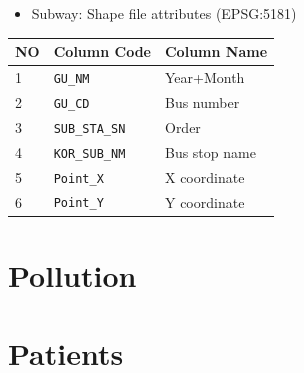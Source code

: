 \documentclass[]{book}
\providecommand{\tightlist}{%
  \setlength{\itemsep}{0pt}\setlength{\parskip}{0pt}}
\theoremstyle{definition}
\theoremstyle{definition}
\theoremstyle{definition}
\theoremstyle{remark}
\begin{document}
\begin{itemize}
\tightlist
\item
  Subway: Shape file attributes (EPSG:5181)
\end{itemize}

\begin{longtable}[]{@{}lll@{}}
\toprule
NO & Column Code & Column Name\tabularnewline
\midrule
\endhead
1 & \texttt{GU\_NM} & Year+Month\tabularnewline
2 & \texttt{GU\_CD} & Bus number\tabularnewline
3 & \texttt{SUB\_STA\_SN} & Order\tabularnewline
4 & \texttt{KOR\_SUB\_NM} & Bus stop name\tabularnewline
5 & \texttt{Point\_X} & X coordinate\tabularnewline
6 & \texttt{Point\_Y} & Y coordinate\tabularnewline
\bottomrule
\end{longtable}

\chapter{Pollution}\label{pollution}

\chapter{Patients}\label{patients}


\end{document}
